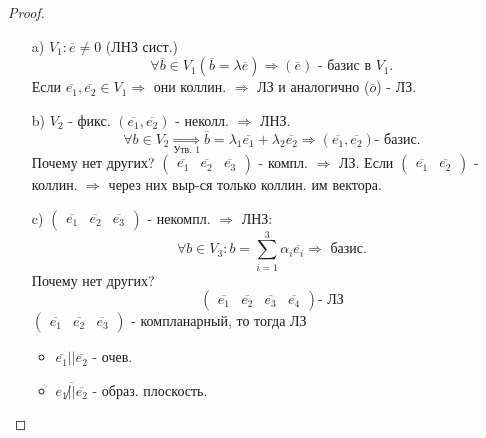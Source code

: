 \begin{proof}
    ~\newline 
\begin{itemize}
    \item [a) ] $V_1\colon \overline{e} \neq 0$ (ЛНЗ сист.)
\[
\forall \overline{b} \in V_1 (\overline{b} = \lambda \overline{e}) \Rightarrow (\overline{e}) \text{ - базис в $V_1$}.
\] 
Если $\overline{e_1}, \overline{e_2} \in V_1 \Rightarrow $ они коллин. $\Rightarrow$ ЛЗ и аналогично ($\overline{o}$) - ЛЗ.
\item [b) ] $V_2$ - фикс. $(\overline{e_1}, \overline{e_2})$ - неколл. $\Rightarrow$ ЛНЗ.
    \[
    \forall b \in V_2 \underset{\text{Утв. 1}}{\Rightarrow} \overline{b} = \lambda_1 \overline{e_1} + \lambda_2 \overline{e_2} \Rightarrow (\overline{e_1}, \overline{e_2}) \text{- базис.}
    \] 
    Почему нет других? $\begin{pmatrix}\overline{e_1} & \overline{e_2} & \overline{e_3} \end{pmatrix}$ - компл. $\Rightarrow$ ЛЗ.
    Если $\begin{pmatrix}\overline{e_1} & \overline{e_2} \end{pmatrix}$ - коллин. $\Rightarrow$ через них выр-ся только коллин. им вектора.
\item [c) ] $\begin{pmatrix}\overline{e_1} & \overline{e_2} & \overline{e_3} \end{pmatrix} $ - некомпл. $\Rightarrow$ ЛНЗ:
    \[
    \forall b \in V_3 \colon b = \sum_{i = 1}^{3} \alpha_i \overline{e_i} \Rightarrow \text{ базис.}
    \] 
    Почему нет других?
    \[
        \begin{pmatrix}\overline{e_1} & \overline{e_2} & \overline{e_3} & \overline{e_4} \end{pmatrix} \text{- ЛЗ}
    \]
$\begin{pmatrix}\overline{e_1} & \overline{e_2} & \overline{e_3} \end{pmatrix}$ - компланарный, то тогда ЛЗ
\begin{itemize}
    \item $\overline{e_1} || \overline{e_2}$ - очев. 
    \item $\overline{e_1 \not|| \overline{e_2}}$ - образ. плоскость.
\end{itemize}
\end{itemize}

\end{proof} 
